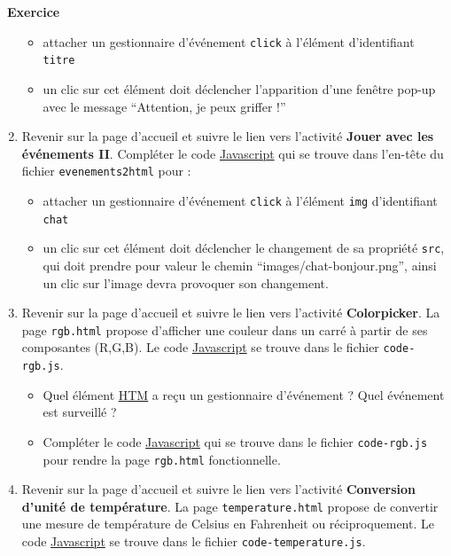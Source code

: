 \documentclass[
  11pt,
]{article}
\newcommand{\passthrough}[1]{#1}
\newcounter{exo}
\newenvironment{exercice}[1]
{\par \medskip   \addtocounter{exo}{1} \noindent  
\begin{bclogo}[arrondi =0.1,   noborder = true, logo=\bccrayon, marge=4]{~\textbf{Exercice} \textbf{\theexo} {\itshape #1} }  \par}
{
\end{bclogo}
 \par \bigskip }
\newcounter{prop}
\begin{document}
\begin{exercice}{}
\begin{enumerate}
  \begin{itemize}
  \item
    attacher un gestionnaire d'événement \passthrough{\lstinline!click!}
    à l'élément d'identifiant \passthrough{\lstinline!titre!}
  \item
    un clic sur cet élément doit déclencher l'apparition d'une fenêtre
    pop-up avec le message ``Attention, je peux griffer !''
  \end{itemize}
\item
  Revenir sur la page d'accueil et suivre le lien vers l'activité
  \textbf{Jouer avec les événements II}. Compléter le code
  \href{https://developer.mozilla.org/fr/docs/Glossaire/JavaScript}{Javascript}
  qui se trouve dans l'en-tête du fichier
  \passthrough{\lstinline!evenements2html!} pour :

  \begin{itemize}
  \item
    attacher un gestionnaire d'événement \passthrough{\lstinline!click!}
    à l'élément \passthrough{\lstinline!img!} d'identifiant
    \passthrough{\lstinline!chat!}
  \item
    un clic sur cet élément doit déclencher le changement de sa
    propriété \passthrough{\lstinline!src!}, qui doit prendre pour
    valeur le chemin ``images/chat-bonjour.png'', ainsi un clic sur
    l'image devra provoquer son changement.
  \end{itemize}
\item
  Revenir sur la page d'accueil et suivre le lien vers l'activité
  \textbf{Colorpicker}. La page \passthrough{\lstinline!rgb.html!}
  propose d'afficher une couleur dans un carré à partir de ses
  composantes (R,G,B). Le code
  \href{https://developer.mozilla.org/fr/docs/Glossaire/JavaScript}{Javascript}
  se trouve dans le fichier \passthrough{\lstinline!code-rgb.js!}.

  \begin{itemize}
  \item
    Quel élément
    \href{https://developer.mozilla.org/fr/docs/Glossaire/HTML}{HTM} a
    reçu un gestionnaire d'événement ? Quel événement est surveillé ?
  \item
    Compléter le code
    \href{https://developer.mozilla.org/fr/docs/Glossaire/JavaScript}{Javascript}
    qui se trouve dans le fichier \passthrough{\lstinline!code-rgb.js!}
    pour rendre la page \passthrough{\lstinline!rgb.html!}
    fonctionnelle.
  \end{itemize}
\item
  Revenir sur la page d'accueil et suivre le lien vers l'activité
  \textbf{Conversion d'unité de température}. La page
  \passthrough{\lstinline!temperature.html!} propose de convertir une
  mesure de température de Celsius en Fahrenheit ou réciproquement. Le
  code
  \href{https://developer.mozilla.org/fr/docs/Glossaire/JavaScript}{Javascript}
  se trouve dans le fichier
  \passthrough{\lstinline!code-temperature.js!}.


\end{enumerate}
\end{exercice}
\end{document}

